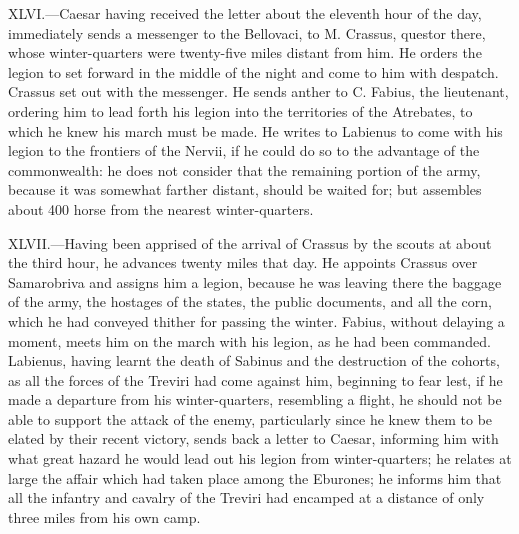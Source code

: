 XLVI.—Caesar having received the letter about the eleventh hour of the
day, immediately sends a messenger to the Bellovaci, to M. Crassus,
questor there, whose winter-quarters were twenty-five miles distant from
him. He orders the legion to set forward in the middle of the night and
come to him with despatch. Crassus set out with the messenger. He sends
anther to C. Fabius, the lieutenant, ordering him to lead forth his
legion into the territories of the Atrebates, to which he knew his march
must be made. He writes to Labienus to come with his legion to the
frontiers of the Nervii, if he could do so to the advantage of the
commonwealth: he does not consider that the remaining portion of the
army, because it was somewhat farther distant, should be waited for; but
assembles about 400 horse from the nearest winter-quarters.

XLVII.—Having been apprised of the arrival of Crassus by the scouts at
about the third hour, he advances twenty miles that day. He appoints
Crassus over Samarobriva and assigns him a legion, because he was
leaving there the baggage of the army, the hostages of the states, the
public documents, and all the corn, which he had conveyed thither for
passing the winter. Fabius, without delaying a moment, meets him on the
march with his legion, as he had been commanded. Labienus, having learnt
the death of Sabinus and the destruction of the cohorts, as all the
forces of the Treviri had come against him, beginning to fear lest, if
he made a departure from his winter-quarters, resembling a flight, he
should not be able to support the attack of the enemy, particularly
since he knew them to be elated by their recent victory, sends back a
letter to Caesar, informing him with what great hazard he would lead out
his legion from winter-quarters; he relates at large the affair which
had taken place among the Eburones; he informs him that all the infantry
and cavalry of the Treviri had encamped at a distance of only three
miles from his own camp.

